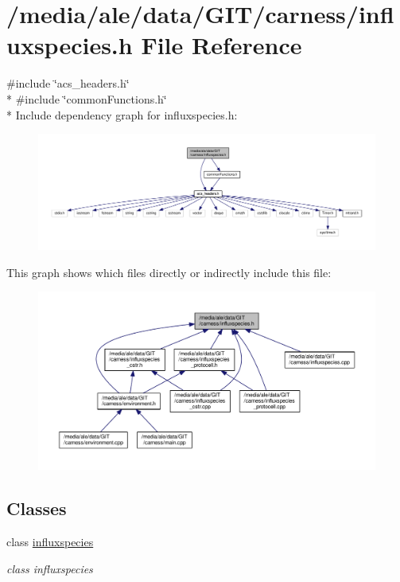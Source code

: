 \hypertarget{a00076}{\section{/media/ale/data/\-G\-I\-T/carness/influxspecies.h File Reference}
\label{a00076}
}
{\ttfamily \#include \char`\"{}acs\-\_\-headers.\-h\char`\"{}}\\*
{\ttfamily \#include \char`\"{}common\-Functions.\-h\char`\"{}}\\*
Include dependency graph for influxspecies.\-h\-:\nopagebreak
\begin{figure}[H]
\begin{center}
\leavevmode
\includegraphics[width=350pt]{a00146}
\end{center}
\end{figure}
This graph shows which files directly or indirectly include this file\-:\nopagebreak
\begin{figure}[H]
\begin{center}
\leavevmode
\includegraphics[width=350pt]{a00147}
\end{center}
\end{figure}
\subsection*{Classes}
\begin{DoxyCompactItemize}
\item 
class \hyperlink{a00005}{influxspecies}
\begin{DoxyCompactList}\small\item\em class influxspecies \end{DoxyCompactList}\end{DoxyCompactItemize}
